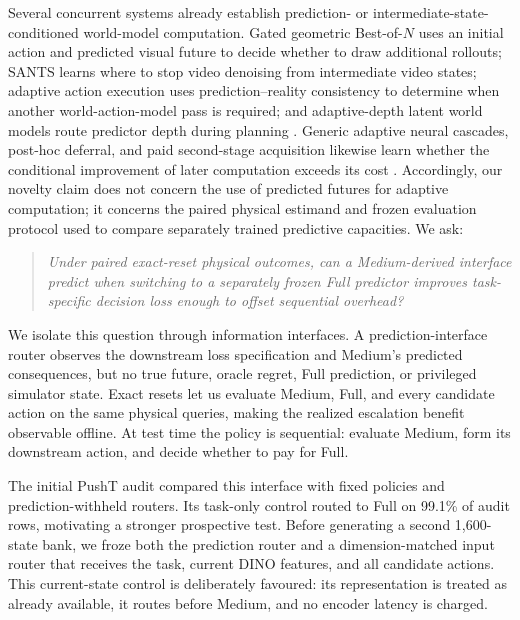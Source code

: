 \documentclass[10pt]{article}
\theoremstyle{definition}
\theoremstyle{remark}
\begin{document}
Several concurrent systems already establish prediction- or
intermediate-state-conditioned world-model computation.  Gated geometric
Best-of-$N$ uses an initial action and predicted visual future to decide whether
to draw additional rollouts; SANTS learns where to stop video denoising from
intermediate video states; adaptive action execution uses prediction--reality
consistency to determine when another world-action-model pass is required; and
adaptive-depth latent world models route predictor depth during planning
\citep{zhao2026geometric,sun2026sants,wang2026imagination,
sivasankar2026adaptive}.  Generic adaptive neural cascades, post-hoc deferral,
and paid second-stage acquisition likewise learn whether the conditional
improvement of later computation exceeds its cost
\citep{bolukbasi2017adaptive,narasimhan2022posthoc,
jitkrittum2023confidence,regol2025acquisition}.  Accordingly, our novelty claim
does not concern the use of predicted futures for adaptive computation; it
concerns the paired physical estimand and frozen evaluation protocol used to
compare separately trained predictive capacities.  We ask:

\begin{quote}
\emph{Under paired exact-reset physical outcomes, can a Medium-derived
interface predict when switching to a separately frozen Full predictor
improves task-specific decision loss enough to offset sequential overhead?}
\end{quote}

We isolate this question through information interfaces.  A
prediction-interface router observes the downstream loss specification and
Medium's predicted consequences, but no true future, oracle regret, Full
prediction, or privileged simulator state.  Exact resets let us evaluate
Medium, Full, and every candidate action on the same physical queries, making
the realized escalation benefit observable offline.  At test time the policy
is sequential: evaluate Medium, form its downstream action, and decide whether
to pay for Full.

The initial PushT audit compared this interface with fixed policies and
prediction-withheld routers.  Its task-only control routed to Full on 99.1\% of
audit rows, motivating a stronger prospective test.  Before generating a
second 1,600-state bank, we froze both the prediction router and a
dimension-matched input router that receives the task, current DINO features,
and all candidate actions.  This current-state control is deliberately
favoured: its representation is treated as already available, it routes before
Medium, and no encoder latency is charged.
\end{document}
